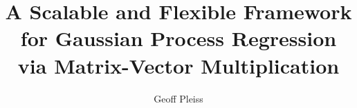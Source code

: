 \documentclass[phd,tocprelim,dvipsnames]{cornell}
\title{A Scalable and Flexible Framework for Gaussian Process Regression via Matrix-Vector Multiplication}
\author{Geoff Pleiss}
\begin{document}
\maketitle
\makecopyright


\begin{abstract}
  
\end{abstract}

\begin{biosketch}
  
\end{biosketch}

\begin{dedication}
  
\end{dedication}

\begin{acknowledgements}
  
\end{acknowledgements}

\contentspage
\tablelistpage
\figurelistpage
{}
\listofalgorithms
\newpage

\normalspacing \setcounter{page}{1} 
\pagestyle{cornell} \addtolength{\parskip}{0.5\baselineskip}









\appendix








\end{document}
